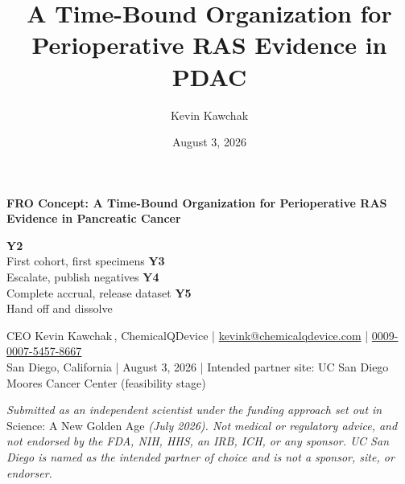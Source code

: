 \documentclass[11pt]{article}
\title{A Time-Bound Organization for Perioperative RAS Evidence in PDAC}
\author{Kevin Kawchak}
\date{August 3, 2026}
\begin{document}
\thispagestyle{plain}

{\raggedright\large\bfseries\color{protoblue} FRO Concept: A Time-Bound
Organization for Perioperative RAS Evidence in Pancreatic Cancer\par}

\vspace{0.2em}

%
{\textbf{Y2}\\First cohort, first specimens}%
{\textbf{Y3}\\Escalate, publish negatives}%
{\textbf{Y4}\\Complete accrual, release dataset}%
{\textbf{Y5}\\Hand off and dissolve}

\vspace{-0.15em}
\apprule{0.8pt}

\noindent\small CEO Kevin Kawchak\,,
ChemicalQDevice \;|\;
\href{mailto:kevink@chemicalqdevice.com}{kevink@chemicalqdevice.com} \;|\;
\href{https://orcid.org/0009-0007-5457-8667}{0009-0007-5457-8667}\\
San Diego, California \;|\; August 3, 2026 \;|\; Intended partner site: UC San
Diego Moores Cancer Center (feasibility stage)\normalsize\par

\vspace{0.05em}

\noindent\footnotesize\textit{Submitted as an independent scientist under the
funding approach set out in} Science: A New Golden Age \textit{(July 2026). Not
medical or regulatory advice, and not endorsed by the FDA, NIH, HHS, an IRB,
ICH, or any sponsor. UC San Diego is named as the intended partner of choice and
is not a sponsor, site, or endorser.}\normalsize\par

\vspace{-0.1em}
\apprule{0.4pt}







\end{document}
